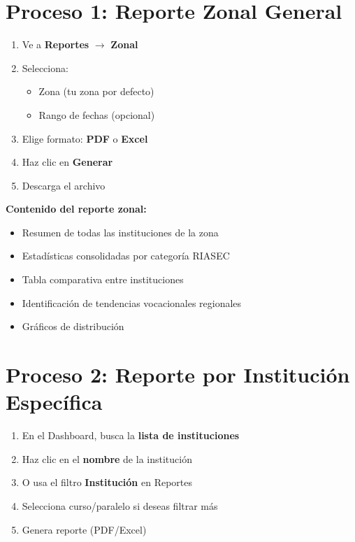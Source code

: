 \documentclass[12pt, a4paper]{report}
\begin{document}
\section{Proceso 1: Reporte Zonal General}
\begin{enumerate}
    \item Ve a \textbf{Reportes} $\rightarrow$ \textbf{Zonal}
    \item Selecciona:
    \begin{itemize}
        \item Zona (tu zona por defecto)
        \item Rango de fechas (opcional)
    \end{itemize}
\item Elige formato: \textbf{PDF} o \textbf{Excel}
\item Haz clic en \textbf{Generar}
\item Descarga el archivo
\end{enumerate}

\textbf{Contenido del reporte zonal:}
\begin{itemize}
    \item Resumen de todas las instituciones de la zona
    \item Estadísticas consolidadas por categoría RIASEC
    \item Tabla comparativa entre instituciones
    \item Identificación de tendencias vocacionales regionales
    \item Gráficos de distribución
\end{itemize}

\section{Proceso 2: Reporte por Institución Específica}
\begin{enumerate}
    \item En el Dashboard, busca la \textbf{lista de instituciones}
    \item Haz clic en el \textbf{nombre} de la institución
    \item O usa el filtro \textbf{Institución} en Reportes
    \item Selecciona curso/paralelo si deseas filtrar más
    \item Genera reporte (PDF/Excel)
\end{enumerate}
\end{document}
